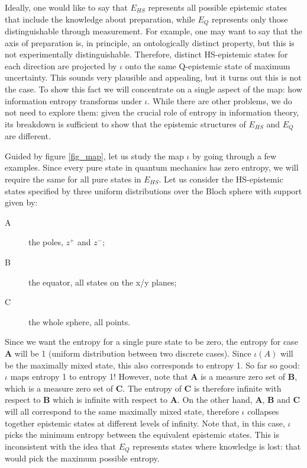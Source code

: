 \documentclass[twocolumn,prl,floatfix,superscriptaddress]{revtex4-2}
\begin{document}
Ideally, one would like to say that $E_{HS}$ represents all possible epistemic states that include the knowledge about preparation, while $E_{Q}$ represents only those distinguishable through measurement. For example, one may want to say that the axis of preparation is, in principle, an ontologically distinct property, but this is not experimentally distinguishable. Therefore, distinct HS-epistemic states for each direction are projected by $\iota$ onto the same Q-epistemic state of maximum uncertainty. This sounds very plausible and appealing, but it turns out this is not the case. To show this fact we will concentrate on a single aspect of the map: how information entropy transforms under $\iota$. While there are other problems, we do not need to explore them: given the crucial role of entropy in information theory, its breakdown is sufficient to show that the epistemic structures of $E_{HS}$ and $E_{Q}$ are different.

Guided by figure \ref{fig_map}, let us study the map $\iota$ by going through a few examples. Since every pure state in quantum mechanics has zero entropy, we will require the same for all pure states in $E_{HS}$. Let us consider the HS-epistemic states specified by three uniform distributions over the Bloch sphere with support given by:
\begin{description}
	\item[A] the poles, $z^+$ and $z^-$;
	\item[B] the equator, all states on the x/y planes;
	\item[C] the whole sphere, all points.
\end{description}
Since we want the entropy for a single pure state to be zero, the entropy for case \textbf{A} will be 1 (uniform distribution between two discrete cases). Since $\iota(A)$ will be the maximally mixed state, this also corresponds to entropy 1. So far so good: $\iota$ maps entropy 1 to entropy 1! However, note that \textbf{A} is a measure zero set of \textbf{B}, which is a measure zero set of \textbf{C}. The entropy of \textbf{C} is therefore infinite with respect to \textbf{B} which is infinite with respect to \textbf{A}. On the other hand, \textbf{A}, \textbf{B} and \textbf{C} will all correspond to the same maximally mixed state, therefore $\iota$ collapses together epistemic states at different levels of infinity. Note that, in this case, $\iota$ picks the minimum entropy between the equivalent epistemic states. This is inconsistent with the idea that $E_{Q}$ represents states where knowledge is lost: that would pick the maximum possible entropy.
\end{document}
